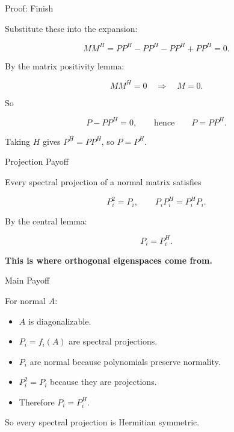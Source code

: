 \documentclass[10pt]{beamer}
\theoremstyle{definition}
\newcommand{\x}[1]{\alert{\textbf{#1}}}
\begin{document}
\begin{frame}{Proof: Finish}

Substitute these into the expansion:

$$
MM^H
=PP^H-PP^H-PP^H+PP^H=0.
$$

\vfill

By the matrix positivity lemma:

$$
MM^H=0\quad\Longrightarrow\quad M=0.
$$

\vfill

So

$$
P-PP^H=0,
\qquad\text{hence}\qquad
P=PP^H.
$$

\vfill

Taking $H$ gives $P^H=PP^H$, so $P=P^H$.

\end{frame}


\begin{frame}{Projection Payoff}

Every spectral projection of a normal matrix satisfies

$$
P_i^2=P_i,
\qquad
P_iP_i^H=P_i^HP_i.
$$

\vfill

By the central lemma:

$$
P_i=P_i^H.
$$

\vfill

\begin{center}
\x{This is where orthogonal eigenspaces come from.}
\end{center}

\end{frame}


\begin{frame}{Main Payoff}

For normal $A$:

\begin{itemize}
\item $A$ is diagonalizable.
\item $P_i=f_i(A)$ are spectral projections.
\item $P_i$ are normal because polynomials preserve normality.
\item $P_i^2=P_i$ because they are projections.
\item Therefore $P_i=P_i^H$.
\end{itemize}

\vfill

So every spectral projection is Hermitian symmetric.

\end{frame}
\end{document}
